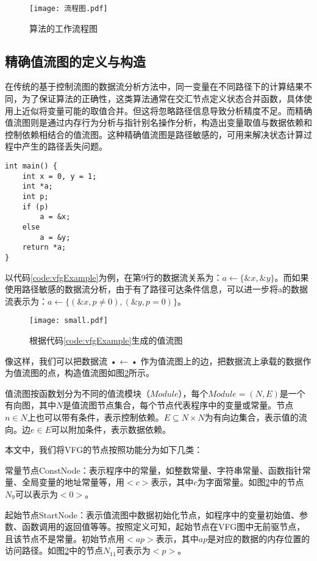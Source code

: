 \begin{figure}[H]
	\centering
	\texttt{[image: 流程图.pdf]}
	\caption{算法的工作流程图}
	\label{fig:流程图}
\end{figure}

\subsection{精确值流图的定义与构造}

在传统的基于控制流图的数据流分析方法中，同一变量在不同路径下的计算结果不同，为了保证算法的正确性，这类算法通常在交汇节点定义状态合并函数，具体使用上近似将变量可能的取值合并。但这将忽略路径信息导致分析精度不足。而精确值流图则是通过内存行为分析与指针别名操作分析，构造出变量取值与数据依赖和控制依赖相结合的值流图。这种精确值流图是路径敏感的，可用来解决状态计算过程中产生的路径丢失问题。

\begin{lstlisting}[label=code:vfgExample,caption=代码样例]
int main() {
	int x = 0, y = 1;
	int *a;
	int p;
	if (p)
		a = &x;
	else
		a = &y;
	return *a;
}
\end{lstlisting}

以代码\ref{code:vfgExample}为例，在第9行的数据流关系为：$ a \gets \{\&x, \&y\} $。而如果使用路径敏感的数据流分析，由于有了路径可达条件信息，可以进一步将a的数据流表示为：$ a \gets \{(\&x, p ≠ 0), (\&y, p = 0)\} $。

\begin{figure}[H]
	\centering
	\texttt{[image: small.pdf]}
	\caption{根据代码\ref{code:vfgExample}生成的值流图}
	\label{fig:small}
\end{figure}

像这样，我们可以把数据流 • ← • 作为值流图上的边，把数据流上承载的数据作为值流图的点，构造值流图如图\ref{fig:small}所示。

值流图按函数划分为不同的值流模块（$ Module $），每个$ Module = (N, E) $是一个有向图，其中$ N $是值流图节点集合，每个节点代表程序中的变量或常量。节点$ n ∈ N $上也可以带有条件，表示控制依赖。$ E ⊆ N × N $为有向边集合，表示值的流向。边$ e ∈ E $可以附加条件，表示数据依赖。

本文中，我们将VFG的节点按照功能分为如下几类：

常量节点ConstNode：表示程序中的常量，如整数常量、字符串常量、函数指针常量、全局变量的地址常量等，用$ <c> $表示，其中$ c $为字面常量。如图\ref{fig:small}中的节点$ N_{9} $可以表示为$ <0> $。

起始节点StartNode：表示值流图中数据初始化节点，如程序中的变量初始值、参数、函数调用的返回值等等。按照定义可知，起始节点在VFG图中无前驱节点，且该节点不是常量。初始节点用$ <ap> $表示，其中$ ap $是对应的数据的内存位置的访问路径。如图\ref{fig:small}中的节点$ N_{11} $可表示为$ <p> $。

